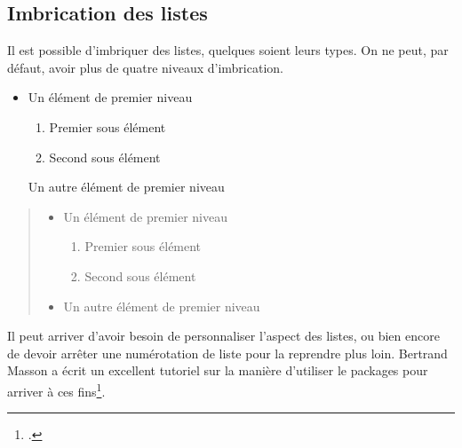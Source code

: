 \subsection{Imbrication des listes}

Il est possible d'imbriquer des listes, quelques soient leurs types. On ne peut, par défaut, avoir plus de quatre niveaux d'imbrication.

\begin{latexcode}
\begin{itemize}
    \item Un élément de premier niveau
    \begin{enumerate}
            \item Premier sous élément
            \item Second sous élément
    \end{enumerate}
    \iteem Un autre élément de premier niveau
\end{itemize}
\end{latexcode}

\begin{quotation}
\noindent\begin{itemize}
    \item Un élément de premier niveau
    \begin{enumerate}
            \item Premier sous élément
            \item Second sous élément
    \end{enumerate}
    \item Un autre élément de premier niveau
\end{itemize}
\end{quotation}

\begin{plusloins}
Il peut arriver d'avoir besoin de personnaliser l'aspect des listes, ou bien encore de devoir arrêter une numérotation de liste pour la reprendre plus loin. Bertrand Masson a écrit un excellent tutoriel sur la manière d'utiliser le packages  pour arriver à ces fins\footcite{bebert_liste}. 
\end{plusloins}

